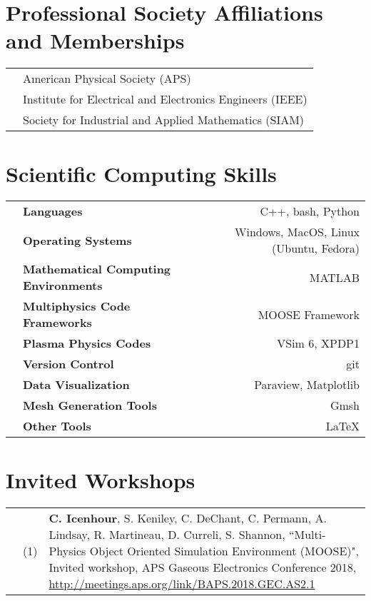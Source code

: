 \documentclass{article}
\begin{document}
\section*{Professional Society Affiliations and Memberships}

\begin{tabularx}{\textwidth}{l l}
	\hspace{2em} & American Physical Society (APS) \\
				 & Institute for Electrical and Electronics Engineers (IEEE) \\
				 & Society for Industrial and Applied Mathematics (SIAM)
\end{tabularx}

\section*{Scientific Computing Skills}

	\begin{tabularx}{\textwidth}{l X r}
		\hspace {2em} & \textbf{Languages} & C++, bash, Python \\
					  & \textbf{Operating Systems} & Windows, MacOS, Linux (Ubuntu, Fedora) \\
					  & \textbf{Mathematical Computing Environments} & MATLAB \\
					  & \textbf{Multiphysics Code Frameworks} & MOOSE Framework \\
					  & \textbf{Plasma Physics Codes} & VSim 6, XPDP1 \\
					  & \textbf{Version Control} & git \\
					  & \textbf{Data Visualization} & Paraview, Matplotlib \\
					  & \textbf{Mesh Generation Tools} & Gmsh \\
					  & \textbf{Other Tools} & \LaTeX
	\end{tabularx}

\section*{Invited Workshops}

	\begin{tabularx}{\textwidth}{l l X}
		\hspace{2em}
			& (1)  & \textbf{C. Icenhour}, S. Keniley, C. DeChant, C. Permann, A. Lindsay, R. Martineau, D. Curreli, S. Shannon, ``Multi-Physics Object Oriented Simulation Environment (MOOSE)", Invited workshop, APS Gaseous Electronics Conference 2018, \url{http://meetings.aps.org/link/BAPS.2018.GEC.AS2.1}
	\end{tabularx}
\end{document}
